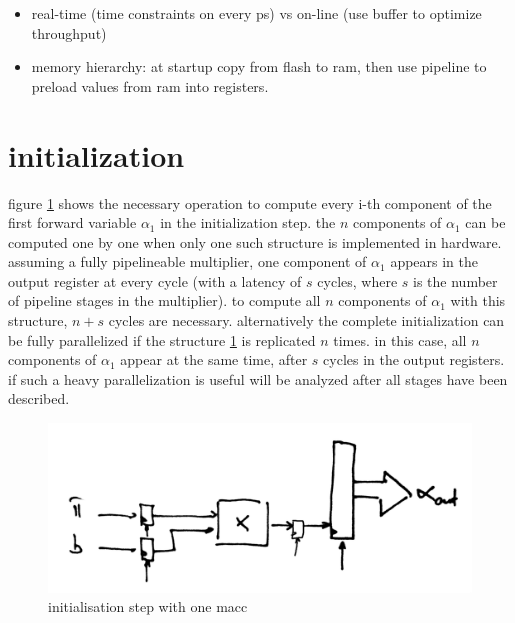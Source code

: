 \documentclass[mscthesis]{usiinfthesis}
\begin{document}
\begin{itemize}
    \item real-time (time constraints on every ps) vs on-line (use buffer to
        optimize throughput)
    \item memory hierarchy: at startup copy from flash to ram, then use pipeline
        to preload values from ram into registers.
\end{itemize}

\section{initialization}

figure \ref{fig:init_s} shows the necessary operation to compute every i-th
component of the first forward variable $ \alpha_1 $ in the initialization
step.  the $ n $ components of $ \alpha_1 $ can be computed one by one when
only one such structure is implemented in hardware. assuming a fully
pipelineable multiplier, one component of $ \alpha_1 $ appears in the output
register at every cycle (with a latency of $ s $ cycles, where $ s $ is the
number of pipeline stages in the multiplier). to compute all $ n $ components
of $ \alpha_1 $ with this structure, $ n + s $ cycles are necessary.
alternatively the complete initialization can be fully parallelized if the
structure \ref{fig:init_s} is replicated $ n $ times. in this case, all
$ n $ components of $ \alpha_1 $ appear at the same time, after $ s $ cycles in
the output registers. if such a heavy parallelization is useful will be
analyzed after all stages have been described.

\begin{figure}
    \includegraphics[width=1\columnwidth]{./schema/arch_init_s.png}
    \caption{initialisation step with one macc}
    \label{fig:init_s}
\end{figure}
\end{document}
